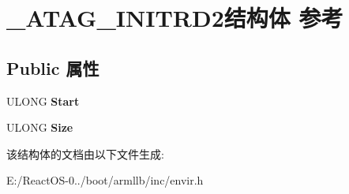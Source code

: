 \hypertarget{struct___a_t_a_g___i_n_i_t_r_d2}{}\section{\+\_\+\+A\+T\+A\+G\+\_\+\+I\+N\+I\+T\+R\+D2结构体 参考}
\label{struct___a_t_a_g___i_n_i_t_r_d2}
\subsection*{Public 属性}
\begin{DoxyCompactItemize}
\item 
\mbox{\label{struct___a_t_a_g___i_n_i_t_r_d2_a0eb2669f73e15dae1201c5683e565562}} 
U\+L\+O\+NG {\bfseries Start}
\item 
\mbox{\label{struct___a_t_a_g___i_n_i_t_r_d2_acdb4bb1dbed85bedf7178d2c1b45721c}} 
U\+L\+O\+NG {\bfseries Size}
\end{DoxyCompactItemize}


该结构体的文档由以下文件生成\+:\begin{DoxyCompactItemize}
\item 
E\+:/\+React\+O\+S-\/0../boot/armllb/inc/envir.\+h\end{DoxyCompactItemize}
